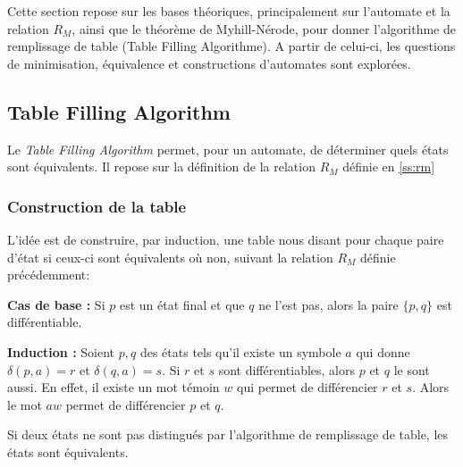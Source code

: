 Cette section repose sur les bases théoriques, principalement sur l'automate et la relation $R_M$, ainsi que le théorème de Myhill-Nérode, pour donner l'algorithme de remplissage de table (Table Filling Algorithme). A partir de celui-ci, les questions de minimisation, équivalence et constructions d'automates sont explorées.


\subsection{Table Filling Algorithm}\label{ss:tfa}

Le \emph{Table Filling Algorithm} permet, pour un automate, de déterminer quels états sont équivalents. Il repose sur la définition de la relation $R_M$ définie en \ref{ss:rm}

\subsubsection{Construction de la table}

L'idée est de construire, par induction, une table nous disant pour chaque paire d'état si ceux-ci sont équivalents où non, suivant la relation $R_M$ définie précédemment:

\textbf{Cas de base :} Si $p$ est un état final et que $q$ ne l'est pas, alors la paire $\{p,q\}$ est différentiable.

\textbf{Induction : } Soient $p,q$ des états tels qu'il existe un symbole $a$ qui donne $\delta(p,a)=r$ et $\delta(q,a)=s$. Si $r$ et $s$ sont différentiables, alors $p$ et $q$ le sont aussi. En effet, il existe un mot témoin $w$ qui permet de différencier $r$ et $s$. Alors le mot $aw$ permet de différencier $p$ et $q$.

\begin{theorem}
	Si deux états ne sont pas distingués par l'algorithme de remplissage de table, les états sont équivalents.
\end{theorem}

